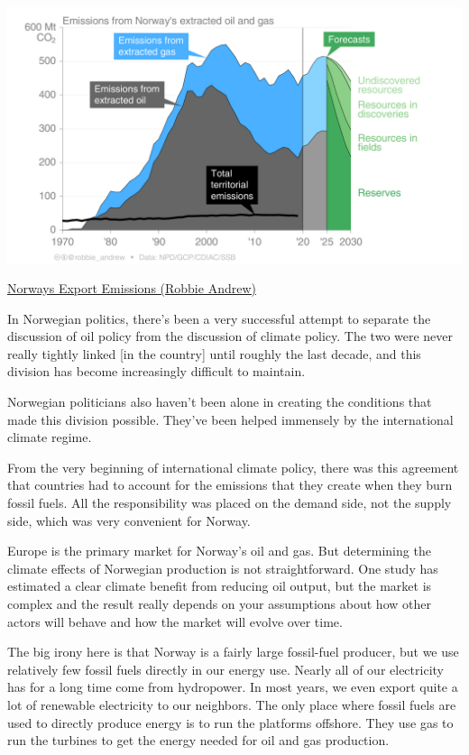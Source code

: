 \documentclass[
]{book}
\begin{document}
\includegraphics{fig/Emissions_extracted_Oil_Gas_Norway.png}

\href{https://folk.universitetetioslo.no/roberan/t/export_emissions.shtml}{Norways Export Emissions (Robbie Andrew)}

In Norwegian politics, there's been a very successful attempt to separate the discussion of oil policy from the discussion of climate policy. The two were never really tightly linked {[}in the country{]} until roughly the last decade, and this division has become increasingly difficult to maintain.

Norwegian politicians also haven't been alone in creating the conditions that made this division possible. They've been helped immensely by the international climate regime.

From the very beginning of international climate policy, there was this agreement that countries had to account for the emissions that they create when they burn fossil fuels. All the responsibility was placed on the demand side, not the supply side, which was very convenient for Norway.

Europe is the primary market for Norway's oil and gas. But determining the climate effects of Norwegian production is not straightforward. One study has estimated a clear climate benefit from reducing oil output, but the market is complex and the result really depends on your assumptions about how other actors will behave and how the market will evolve over time.

The big irony here is that Norway is a fairly large fossil-fuel producer, but we use relatively few fossil fuels directly in our energy use. Nearly all of our electricity has for a long time come from hydropower. In most years, we even export quite a lot of renewable electricity to our neighbors.
The only place where fossil fuels are used to directly produce energy is to run the platforms offshore. They use gas to run the turbines to get the energy needed for oil and gas production.
\end{document}
